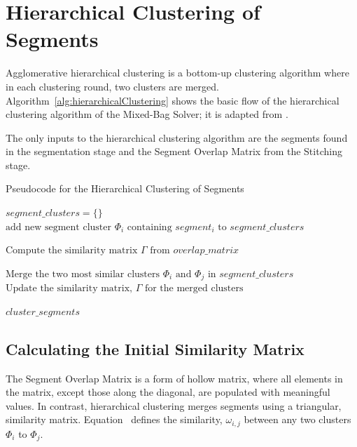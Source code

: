 \section{Hierarchical Clustering of Segments}\label{sec:hierarchicalClustering}

Agglomerative hierarchical clustering is a bottom-up clustering algorithm where in each clustering round, two clusters are merged.  Algorithm~\ref{alg:hierarchicalClustering} shows the basic flow of the hierarchical clustering algorithm of the Mixed-Bag Solver; it is adapted from \cite{tanIntroToDataMining}.  

The only inputs to the hierarchical clustering algorithm are the segments found in the segmentation stage and the Segment Overlap Matrix from the Stitching stage.

\begin{algorithm}[tb]
\caption{Pseudocode for the Hierarchical Clustering of Segments}\label{alg:hierarchicalClustering}
\begin{algorithmic}[1]
	\State $\textit{segment\_clusters} = \{ \}$	
		\State $\text{add new segment cluster } \Phi_i \text{ containing } segment_i \text{ to } \textit{segment\_clusters}$
	\EndFor
\item[]
    \State $\text{Compute the similarity matrix } \Gamma \text{ from } overlap\_matrix$
\item[]
    	\State $\text{Merge the two most similar clusters } \Phi_i \text{ and } \Phi_j \text{ in } \textit{segment\_clusters}$
    	\State $\text{Update the similarity matrix, } \Gamma \text{ for the merged clusters}$
	\EndWhile
\item[]
    \State \Return $\textit{cluster\_segments}$
\EndFunction
\end{algorithmic}
\end{algorithm}

\subsection{Calculating the Initial Similarity Matrix}\label{sec:quantifyingSegmentSimilarity}

The Segment Overlap Matrix is a form of hollow matrix, where all elements in the matrix, except those along the diagonal, are populated with meaningful values.  In contrast, hierarchical clustering merges segments using a triangular, similarity matrix.  Equation~ defines the similarity, $\omega_{i,j}$ between any two clusters $\Phi_i$ to $\Phi_j$.

